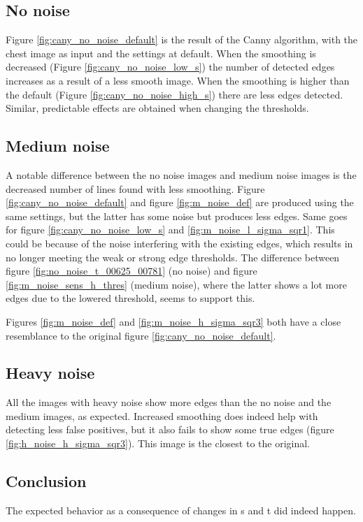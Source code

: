 \documentclass[10pt,a4paper]{article}
\begin{document}
\subsection{No noise}
Figure \ref{fig:cany_no_noise_default} is the result of the Canny algorithm, with the chest image as input and the settings at default. When the smoothing is decreased (Figure \ref{fig:cany_no_noise_low_s}) the number of detected edges increases as a result of a less smooth image. When the smoothing is higher than the default (Figure \ref{fig:cany_no_noise_high_s}) there are less edges detected. Similar, predictable effects are obtained when changing the thresholds. 

\subsection{Medium noise}
A notable difference between the no noise images and medium noise images is the decreased number of lines found with less smoothing. Figure \ref{fig:cany_no_noise_default} and figure \ref{fig:m_noise_def} are produced using the same settings, but the latter has some noise but produces less edges. Same goes for figure \ref{fig:cany_no_noise_low_s} and \ref{fig:m_noise_l_sigma_sqr1}. This could be because of the noise interfering with the existing edges, which results in no longer meeting the weak or strong edge thresholds. The difference between figure \ref{fig:no_noise_t_00625_00781} (no noise) and figure \ref{fig:m_noise_sens_h_thres} (medium noise), where the latter shows a lot more edges due to the lowered threshold, seems to support this.

Figures \ref{fig:m_noise_def} and \ref{fig:m_noise_h_sigma_sqr3} both have a close resemblance to the original figure \ref{fig:cany_no_noise_default}.

\subsection{Heavy noise}
All the images with heavy noise show more edges than the no noise and the medium images, as expected. Increased smoothing does indeed help with detecting less false positives, but it also fails to show some true edges (figure \ref{fig:h_noise_h_sigma_sqr3}). This image is the closest to the original.

\subsection{Conclusion}
The expected behavior as a consequence of changes in s and t did indeed happen.
\end{document}
